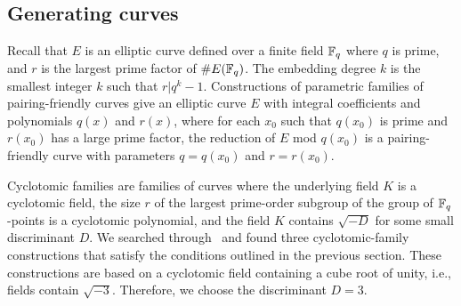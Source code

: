 

\subsection{Generating curves}
\label{subsec:gencurves}

Recall that $E$ is an elliptic curve defined over a finite field $\mathbb{F}_{q}$ where $q$ is prime,
and $r$ is the largest prime factor of $\# E(\mathbb{F}_{q})$.
The embedding degree $k$ is the smallest integer $k$ such that $r | q^k -1$.
Constructions of parametric families of pairing-friendly curves give an elliptic curve $E$ with integral coefficients and polynomials $q(x)$ and $r(x)$,
where for each $x_0$ such that $q(x_0)$ is prime and $r(x_0)$ has a large prime factor, the reduction of $E$ mod $q(x_0)$ is a pairing-friendly curve with parameters $q = q(x_0)$ and $r = r(x_0)$.

Cyclotomic families are families of curves where the underlying field $K$ is a cyclotomic field,
the size $r$ of the largest prime-order subgroup of the group of $\mathbb{F}_{q}$-points is a cyclotomic polynomial,
and the field $K$ contains $\sqrt{-D}$ for some small discriminant $D$.
We searched through~\cite{2010/freeman} and found three cyclotomic-family constructions that satisfy the conditions outlined in the previous section.
These constructions are based on a cyclotomic field containing a cube root of unity,
i.e., fields contain $\sqrt{-3}$.
Therefore, we choose the discriminant $D = 3$.

